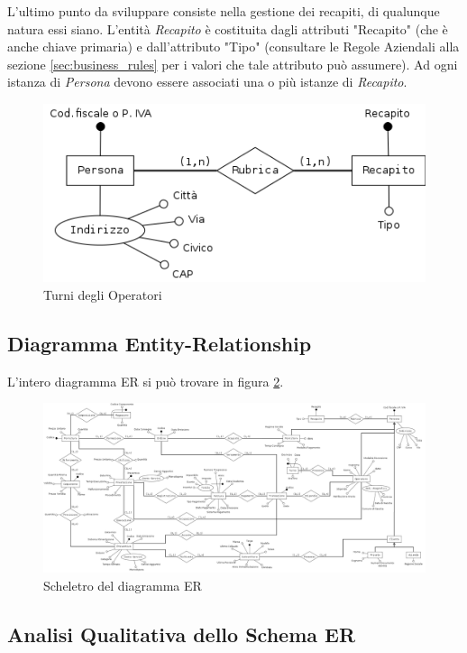 			L'ultimo punto da sviluppare consiste nella gestione dei recapiti, di qualunque natura essi siano. L'entità \emph{Recapito} è costituita dagli attributi "Recapito" (che è anche chiave primaria) e dall'attributo "Tipo" (consultare le Regole Aziendali alla sezione \ref{sec:business_rules} per i valori che tale attributo può assumere).
			Ad ogni istanza di \emph{Persona} devono essere associati una o più istanze di \emph{Recapito}.
			
			\begin{figure}
				\centering
				\includegraphics[width=11.5cm]{images/finitures/persona_rubrica.png}
				\caption{Turni degli Operatori}
				\label{fig:persona_recapito}
			\end{figure}
	
	\subsection{Diagramma Entity-Relationship}
		
		L'intero diagramma ER si può trovare in figura \ref{fig:er}.
			
		\begin{figure}
			\centering
			\includegraphics[width=22cm]{images/finitures/schema.png}
			\caption{Scheletro del diagramma ER}
			\label{fig:er}
		\end{figure}

	\subsection{Analisi Qualitativa dello Schema ER}
		
